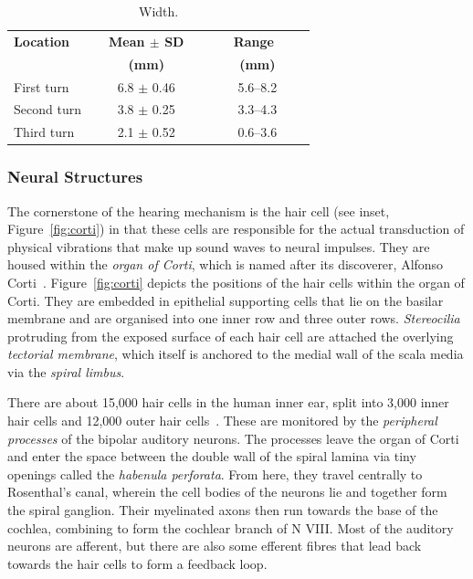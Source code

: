 \begin{table}
\begin{subtable}[t]{0.47\textwidth}
    \end{subtable}
    
    \vspace{1em}
	\begin{subtable}[t]{0.47\textwidth}
        \caption{Width.}
        \label{table:dimensions_width}

        \begin{tabularx}{\textwidth}{X c c}
			\toprule
			\textbf{Location} 	& \textbf{~~Mean $ \boldsymbol\pm $ SD~~}	& \textbf{~~~Range~~~~}\\
								& \textbf{(mm)}								& \textbf{(mm)} \\
			\midrule
			
			First turn		& 6.8 $ \pm $ 0.46			& 5.6--8.2\\
			Second turn		& 3.8 $ \pm $ 0.25			& 3.3--4.3\\
			Third turn		& 2.1 $ \pm $ 0.52			& 0.6--3.6\\
			\bottomrule
		\end{tabularx}
		
    \end{subtable}
    
\end{table}

\subsubsection{Neural Structures}

The cornerstone of the hearing mechanism is the hair cell (see inset,
Figure~\ref{fig:corti}) in that these cells are responsible for the actual
transduction of physical vibrations that make up sound waves to neural impulses.
They are housed within the \emph{organ of Corti}, which is named after its
discoverer, Alfonso Corti~\cite{jahn2001}. Figure~\ref{fig:corti} depicts the
positions of the hair cells within the organ of Corti. They are embedded in
epithelial supporting cells that lie on the basilar membrane and are organised
into one inner row and three outer rows. \emph{Stereocilia} protruding from the
exposed surface of each hair cell are attached the overlying \emph{tectorial
membrane}, which itself is anchored to the medial wall of the scala media via
the \emph{spiral limbus}.

There are about 15,000 hair cells in the human inner ear, split into 3,000 inner
hair cells and 12,000 outer hair cells~\cite{nadol1993,flint2010}. These are
monitored by the \emph{peripheral processes} of the bipolar auditory neurons.
The processes leave the organ of Corti and enter the space between the double
wall of the spiral lamina via tiny openings called the \emph{habenula
perforata}. From here, they travel centrally to Rosenthal's canal, wherein the
cell bodies of the neurons lie and together form the spiral ganglion. Their
myelinated axons then run towards the base of the cochlea, combining to form the
cochlear branch of N VIII. Most of the auditory neurons are afferent, but there
are also some efferent fibres that lead back towards the hair cells to form a
feedback loop.

